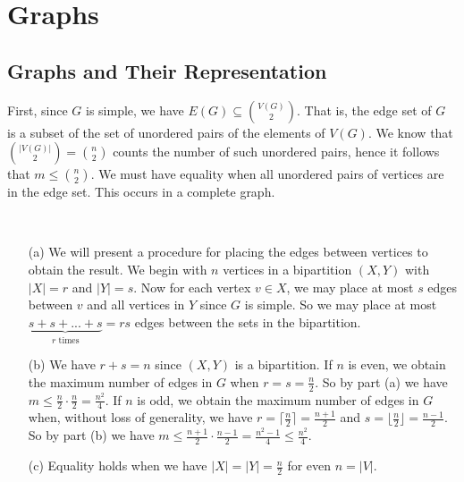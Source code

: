 \chapter{Graphs}

\section{Graphs and Their Representation}

\begin{ans}
First, since $G$ is simple, we have $E(G) \subseteq \binom{V(G)}{2}$. That is, the edge set of $G$ is a subset of the set of unordered pairs of the elements of $V(G)$. We know that $\binom{|V(G)|}{2} = \binom{n}{2}$ counts the number of such unordered pairs, hence it follows that $m \le \binom{n}{2}$. We must have equality when all unordered pairs of vertices are in the edge set. This occurs in a complete graph.
\end{ans}

\begin{ans} \
\begin{itemize}
	\item[(a)] We will present a procedure for placing the edges between vertices to obtain the result. We begin with $n$ vertices in a bipartition $(X,Y)$ with $|X| = r$ and $|Y| = s$. Now for each vertex $v \in X$, we may place at most $s$ edges between $v$ and all vertices in $Y$ since $G$ is simple. So we may place at most $\underbrace{s + s + ... + s}_\text{$r$ times} = rs$ edges between the sets in the bipartition.
	\item[(b)] We have $r + s = n$ since $(X,Y)$ is a bipartition. If $n$ is even, we obtain the maximum number of edges in $G$ when $r = s = \frac{n}{2}$. So by part (a) we have $m \le \frac{n}{2} \cdot \frac{n}{2} = \frac{n^2}{4}$. If $n$ is odd, we obtain the maximum number of edges in $G$ when, without loss of generality, we have $r = \lceil\frac{n}{2}\rceil = \frac{n+1}{2}$ and $s = \lfloor\frac{n}{2}\rfloor = \frac{n-1}{2}$. So by part (b) we have $m \le \frac{n+1}{2} \cdot \frac{n-1}{2} = \frac{n^2 - 1}{4} \leq \frac{n^2}{4}$.
	\item[(c)] Equality holds when we have $|X| = |Y| = \frac{n}{2}$ for even $n = |V|$.
\end{itemize}
\end{ans}